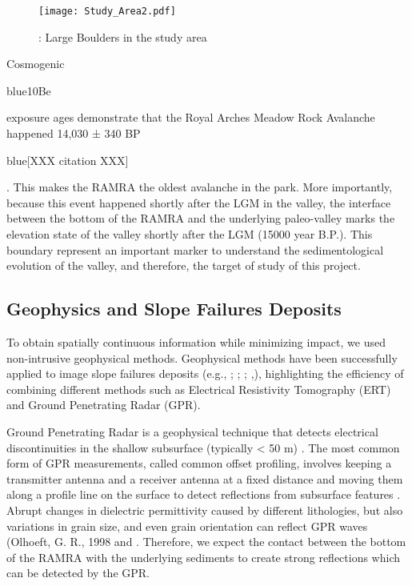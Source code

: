 \documentclass[5p]{elsarticle}
\newcommand{\COMON}{\begin{color}{blue}}
\newcommand{\COMOFF}{\end{color}}
\begin{document}
                 
                                    \begin{figure}[h]

	\texttt{[image: Study\_Area2.pdf]}
		\caption{: Large Boulders in the study area  \label{Study_Area2}}

								   \end{figure}



Cosmogenic \COMON 10Be \COMOFF exposure ages demonstrate that the Royal Arches Meadow Rock Avalanche happened 14,030 ± 340 BP \COMON[XXX citation XXX]\COMOFF. This makes the RAMRA the oldest avalanche in the park. More importantly, because this event happened shortly after the LGM in the valley, the interface between the bottom of the RAMRA and the underlying paleo-valley marks the elevation state of the valley shortly after the LGM (15000 year B.P.). This boundary represent an important marker to understand the sedimentological evolution of the valley, and therefore, the target of study of this project.  

\bigskip

                 
                 
\subsection{Geophysics and Slope Failures Deposits}

To obtain spatially continuous information while minimizing impact, we used non-intrusive geophysical methods. Geophysical methods have been successfully applied to image slope failures deposits (e.g., \cite{sass2006determination}; \cite{otto2006comparing}; \cite{socco2010geophysical}; \cite{brody2015near},\cite{liu2018near}), highlighting the efficiency of combining different methods such as Electrical Resistivity Tomography (ERT) and Ground Penetrating Radar (GPR). 
                 
Ground Penetrating Radar is a geophysical technique that detects electrical discontinuities in the shallow subsurface (typically < 50 m) \citep{neal2004ground}. The most common form of GPR measurements, called common offset profiling, involves keeping a transmitter antenna and a receiver antenna at a fixed distance and moving them along a profile line on the surface to detect reflections from subsurface features \citep{jol2008ground}. Abrupt changes in dielectric permittivity caused by different lithologies, but also variations in grain size, and even grain orientation can reflect GPR waves (Olhoeft, G. R., 1998 and \citep{neal2004ground}. Therefore, we expect the contact between the bottom of the RAMRA with the underlying sediments to create strong reflections which can be detected by the GPR.          
\end{document}
